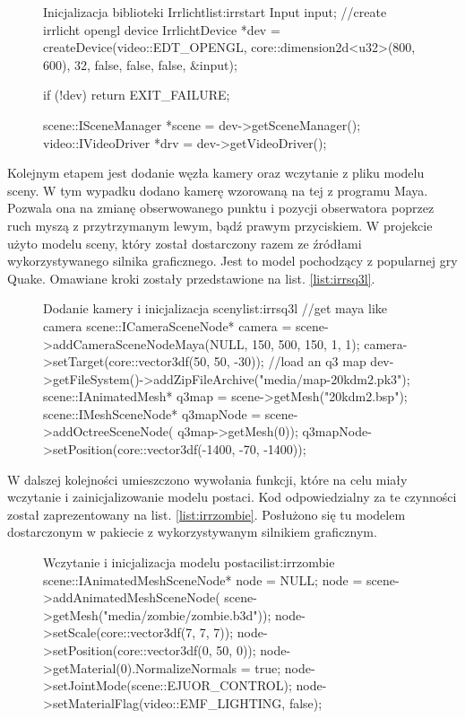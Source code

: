 \documentclass[11pt]{mwrep}
\begin{document}
\begin{figure}
\begin{listing}{Inicjalizacja biblioteki Irrlicht}{list:irrstart}
	Input input;
	//create irrlicht opengl device
	IrrlichtDevice *dev = createDevice(video::EDT_OPENGL,
			core::dimension2d<u32>(800, 600), 32, false, false, false, &input);

	if (!dev)
		return EXIT_FAILURE;

	scene::ISceneManager *scene = dev->getSceneManager();
	video::IVideoDriver *drv = dev->getVideoDriver();

\end{listing}
\end{figure}

Kolejnym etapem jest dodanie węzła kamery oraz wczytanie z pliku modelu sceny. W tym wypadku dodano kamerę wzorowaną na tej z programu Maya. Pozwala ona na zmianę obserwowanego punktu i pozycji obserwatora poprzez ruch myszą z przytrzymanym lewym, bądź prawym przyciskiem. W projekcie użyto modelu sceny, który został dostarczony razem ze źródłami wykorzystywanego silnika graficznego. Jest to model pochodzący z popularnej gry Quake. Omawiane kroki zostały przedstawione na list. \ref{list:irrsq3l}.

\begin{figure}
\begin{listing}{Dodanie kamery i inicjalizacja sceny}{list:irrsq3l}
	//get maya like camera
	scene::ICameraSceneNode* camera = scene->addCameraSceneNodeMaya(NULL, 150,
			500, 150, 1, 1);
	camera->setTarget(core::vector3df(50, 50, -30));
	//load an q3 map
	dev->getFileSystem()->addZipFileArchive("media/map-20kdm2.pk3");
	scene::IAnimatedMesh* q3map = scene->getMesh("20kdm2.bsp");
	scene::IMeshSceneNode* q3mapNode = scene->addOctreeSceneNode(
			q3map->getMesh(0));
	q3mapNode->setPosition(core::vector3df(-1400, -70, -1400));
\end{listing}
\end{figure}

W dalszej kolejności umieszczono wywołania funkcji, które na celu miały wczytanie i zainicjalizowanie modelu postaci. Kod odpowiedzialny za te czynności został zaprezentowany na list. \ref{list:irrzombie}. Posłużono się tu modelem dostarczonym w pakiecie z wykorzystywanym silnikiem graficznym. 
\begin{figure}
\begin{listing}{Wczytanie i inicjalizacja modelu postaci}{list:irrzombie}
	scene::IAnimatedMeshSceneNode* node = NULL;
	node = scene->addAnimatedMeshSceneNode(
			scene->getMesh("media/zombie/zombie.b3d"));
	node->setScale(core::vector3df(7, 7, 7));
	node->setPosition(core::vector3df(0, 50, 0));
	node->getMaterial(0).NormalizeNormals = true;
	node->setJointMode(scene::EJUOR_CONTROL);
	node->setMaterialFlag(video::EMF_LIGHTING, false);
\end{listing}
\end{figure}
\end{document}
